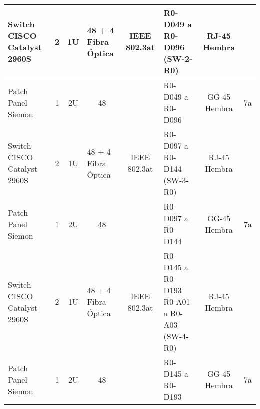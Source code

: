 \begin{table}[htbp]
\begin{tabular}{|p{2.5cm}|p{1.6cm}|llllll}
		Switch CISCO Catalyst 2960S                                        & \multicolumn{1}{c|}{2}                      & \multicolumn{1}{c|}{1U}              & \multicolumn{1}{p{1.2cm}|}{48 + 4 Fibra Óptica} & \multicolumn{1}{c|}{IEEE 802.3at}      & \multicolumn{1}{p{1.6cm}|}{R0-D049 a R0-D096 (SW-2-R0)} & \multicolumn{1}{c|}{RJ-45 Hembra}              & \multicolumn{1}{c|}{}                   \\ \hline
		Patch Panel Siemon                                                 & \multicolumn{1}{c|}{1}                      & \multicolumn{1}{c|}{2U}              & \multicolumn{1}{c|}{48}                  & \multicolumn{1}{c|}{}                  & \multicolumn{1}{p{1.6cm}|}{R0-D049 a R0-D096}           & \multicolumn{1}{c|}{GG-45 Hembra}              & \multicolumn{1}{c|}{7a}                  \\ \hline
		Switch CISCO Catalyst 2960S                                        & \multicolumn{1}{c|}{2}                      & \multicolumn{1}{c|}{1U}              & \multicolumn{1}{p{1.2cm}|}{48 + 4 Fibra Óptica} & \multicolumn{1}{c|}{IEEE 802.3at}      & \multicolumn{1}{p{1.6cm}|}{R0-D097 a R0-D144 (SW-3-R0)} & \multicolumn{1}{c|}{RJ-45 Hembra}              & \multicolumn{1}{c|}{}                   \\ \hline
		Patch Panel Siemon                                                 & \multicolumn{1}{c|}{1}                      & \multicolumn{1}{c|}{2U}              & \multicolumn{1}{c|}{48}                  & \multicolumn{1}{c|}{}                  & \multicolumn{1}{p{1.6cm}|}{R0-D097 a R0-D144}           & \multicolumn{1}{c|}{GG-45 Hembra}              & \multicolumn{1}{c|}{7a}                  \\ \hline
		Switch CISCO Catalyst 2960S                                        & \multicolumn{1}{c|}{2}                      & \multicolumn{1}{c|}{1U}              & \multicolumn{1}{p{1.2cm}|}{48 + 4 Fibra Óptica} & \multicolumn{1}{c|}{IEEE 802.3at}      & \multicolumn{1}{p{1.6cm}|}{R0-D145 a R0-D193 R0-A01 a R0-A03 (SW-4-R0)} & \multicolumn{1}{c|}{RJ-45 Hembra}              & \multicolumn{1}{c|}{}                   \\ \hline
		Patch Panel Siemon                                                 & \multicolumn{1}{c|}{1}                      & \multicolumn{1}{c|}{2U}              & \multicolumn{1}{c|}{48}                  & \multicolumn{1}{c|}{}                  & \multicolumn{1}{p{1.6cm}|}{R0-D145 a R0-D193}           & \multicolumn{1}{c|}{GG-45 Hembra}              & \multicolumn{1}{c|}{7a}                  \\ \hline

\end{tabular}
\end{table}
